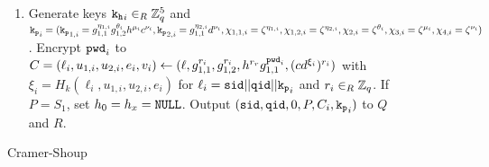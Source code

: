 \begin{figure}[htbp]
\begin{mdframed}[innertopmargin=10pt]
\begin{center}
\caption{Cramer-Shoup \TDSPHF}
\label{fig:cs-tdsphf}
\end{center}

	
	  \begin{enumerate}
	    \item Generate \TDSPHF keys $\mathtt{k_h}_i\in_R\mathbb{Z}_q^{5}$ and 
	      $\mathtt{k_p}_i=(\mathtt{k_p}_{1,i}=g_{1,1}^{\eta_{1,i}} g_{1,2}^{\theta_i} h^{\mu_i} c^{\nu_i}, \mathtt{k_p}_{2,i}=g_{1,1}^{\eta_{2,i}} d^{\nu_i}, \chi_{1,1,i}={\zeta}^{\eta_{1,i}}, \chi_{1,2,i}={\zeta}^{\eta_{2,i}}, \chi_{2,i}={\zeta}^{\theta_i}, \chi_{3,i}={\zeta}^{\mu_i}, \chi_{4,i}={\zeta}^{\nu_i})$. 
	    Encrypt $\mathtt{pwd}_i$ to $C=(\ell_i,u_{1,i},u_{2,i},e_i,v_i)\gets(\ell, g_{1,1}^{r_i}, g_{1,2}^{r_i}, h^{r_r} g_{1,1}^{\mathtt{pwd}_i}, (cd^{\xi_i})^{r_i})$ with $\xi_i=H_k(\ell_i, u_{1,i}, u_{2,i}, e_i)$ for $\ell_i=\mathtt{sid} || \mathtt{qid} || \mathtt{k_p}_i$ and $r_i\in_R\mathbb{Z}_q$.
	    If $P=S_1$, set $h_0=h_x=\mathtt{NULL}$.
	    Output $(\mathtt{sid},\mathtt{qid},0,P,C_i,\mathtt{k_p}_i)$ to $Q$ and $R$.
	    

\end{enumerate}
\end{mdframed}
\end{figure}
